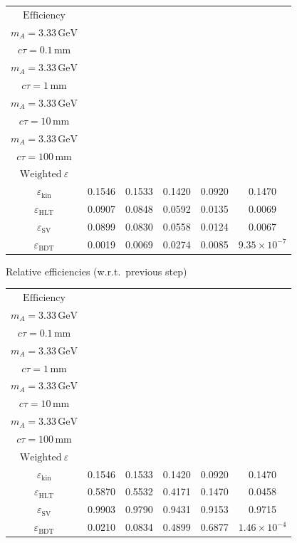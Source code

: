 \documentclass[10pt,a4paper]{article}
\begin{document}
{\begin{tabular}{cccccc}
\toprule
$\mathrm{Efficiency}$ & \shortstack{$m_{\pi}=10\,\mathrm{GeV}$\\$m_{A}=3.33\,\mathrm{GeV}$\\$c\tau=0.1\,\mathrm{mm}$} & \shortstack{$m_{\pi}=10\,\mathrm{GeV}$\\$m_{A}=3.33\,\mathrm{GeV}$\\$c\tau=1\,\mathrm{mm}$} & \shortstack{$m_{\pi}=10\,\mathrm{GeV}$\\$m_{A}=3.33\,\mathrm{GeV}$\\$c\tau=10\,\mathrm{mm}$} & \shortstack{$m_{\pi}=10\,\mathrm{GeV}$\\$m_{A}=3.33\,\mathrm{GeV}$\\$c\tau=100\,\mathrm{mm}$} & \shortstack{$\mathrm{QCD}$\\$\mathrm{Weighted}\ \varepsilon$} \\
\midrule
$\varepsilon_{\mathrm{kin}}$ & 0.1546 & 0.1533 & 0.1420 & 0.0920 & 0.1470\\
$\varepsilon_{\mathrm{HLT}}$ & 0.0907 & 0.0848 & 0.0592 & 0.0135 & 0.0069\\
$\varepsilon_{\mathrm{SV}}$ & 0.0899 & 0.0830 & 0.0558 & 0.0124 & 0.0067\\
$\varepsilon_{\mathrm{BDT}}$ & 0.0019 & 0.0069 & 0.0274 & 0.0085 & $9.35\times10^{-7}$\\
\bottomrule
\end{tabular}

\vspace{18pt}

Relative efficiencies (w.r.t.\ previous step)

\begin{tabular}{cccccc}
\toprule
$\mathrm{Efficiency}$ & \shortstack{$m_{\pi}=10\,\mathrm{GeV}$\\$m_{A}=3.33\,\mathrm{GeV}$\\$c\tau=0.1\,\mathrm{mm}$} & \shortstack{$m_{\pi}=10\,\mathrm{GeV}$\\$m_{A}=3.33\,\mathrm{GeV}$\\$c\tau=1\,\mathrm{mm}$} & \shortstack{$m_{\pi}=10\,\mathrm{GeV}$\\$m_{A}=3.33\,\mathrm{GeV}$\\$c\tau=10\,\mathrm{mm}$} & \shortstack{$m_{\pi}=10\,\mathrm{GeV}$\\$m_{A}=3.33\,\mathrm{GeV}$\\$c\tau=100\,\mathrm{mm}$} & \shortstack{$\mathrm{QCD}$\\$\mathrm{Weighted}\ \varepsilon$} \\
\midrule
$\varepsilon_{\mathrm{kin}}$ & 0.1546 & 0.1533 & 0.1420 & 0.0920 & 0.1470\\
$\varepsilon_{\mathrm{HLT}}$ & 0.5870 & 0.5532 & 0.4171 & 0.1470 & 0.0458\\
$\varepsilon_{\mathrm{SV}}$ & 0.9903 & 0.9790 & 0.9431 & 0.9153 & 0.9715\\
$\varepsilon_{\mathrm{BDT}}$ & 0.0210 & 0.0834 & 0.4899 & 0.6877 & $1.46\times10^{-4}$\\
\bottomrule
\end{tabular}

}
\end{document}
